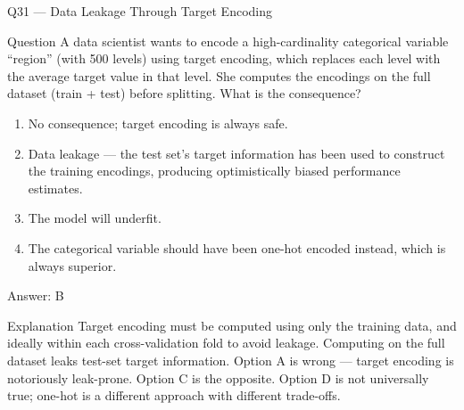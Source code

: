 \documentclass[aspectratio=169,8pt]{beamer}
\begin{document}
	
	\begin{frame}{Q31 --- Data Leakage Through Target Encoding}
		\begin{block}{Question}
			A data scientist wants to encode a high-cardinality categorical variable ``region'' (with 500 levels) using target encoding, which replaces each level with the average target value in that level. She computes the encodings on the full dataset (train + test) before splitting. What is the consequence?
		\end{block}
		\begin{enumerate}
			\item No consequence; target encoding is always safe.
			\item Data leakage --- the test set's target information has been used to construct the training encodings, producing optimistically biased performance estimates.
			\item The model will underfit.
			\item The categorical variable should have been one-hot encoded instead, which is always superior.
		\end{enumerate}
		\begin{exampleblock}{Answer: B}\end{exampleblock}
		\begin{block}{Explanation}
			Target encoding must be computed using only the training data, and ideally within each cross-validation fold to avoid leakage. Computing on the full dataset leaks test-set target information. Option A is wrong --- target encoding is notoriously leak-prone. Option C is the opposite. Option D is not universally true; one-hot is a different approach with different trade-offs.
		\end{block}
	\end{frame}
	
\end{document}
